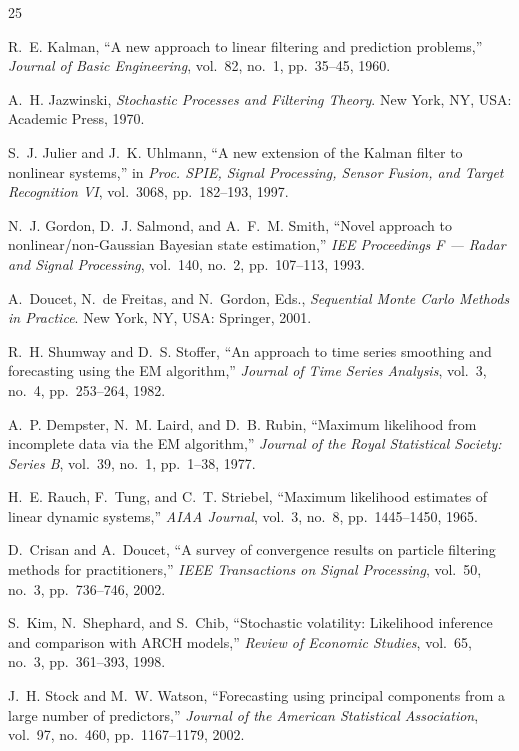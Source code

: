 \documentclass[conference]{IEEEtran}
\begin{document}

\begin{thebibliography}{25}

R.~E. Kalman, ``A new approach to linear filtering and prediction problems,''
\textit{Journal of Basic Engineering}, vol.~82, no.~1, pp.~35--45, 1960.

A.~H. Jazwinski, \textit{Stochastic Processes and Filtering Theory}.
New York, NY, USA: Academic Press, 1970.

S.~J. Julier and J.~K. Uhlmann, ``A new extension of the Kalman filter to nonlinear systems,'' in \textit{Proc. SPIE, Signal Processing, Sensor Fusion, and Target Recognition VI}, vol.~3068, pp.~182--193, 1997.

N.~J. Gordon, D.~J. Salmond, and A.~F.~M. Smith, ``Novel approach to nonlinear/non-Gaussian Bayesian state estimation,'' \textit{IEE Proceedings F --- Radar and Signal Processing}, vol.~140, no.~2, pp.~107--113, 1993.

A.~Doucet, N.~de Freitas, and N.~Gordon, Eds., \textit{Sequential Monte Carlo Methods in Practice}. New York, NY, USA: Springer, 2001.

R.~H. Shumway and D.~S. Stoffer, ``An approach to time series smoothing and forecasting using the EM algorithm,'' \textit{Journal of Time Series Analysis}, vol.~3, no.~4, pp.~253--264, 1982.

A.~P. Dempster, N.~M. Laird, and D.~B. Rubin, ``Maximum likelihood from incomplete data via the EM algorithm,'' \textit{Journal of the Royal Statistical Society: Series B}, vol.~39, no.~1, pp.~1--38, 1977.

H.~E. Rauch, F.~Tung, and C.~T. Striebel, ``Maximum likelihood estimates of linear dynamic systems,'' \textit{AIAA Journal}, vol.~3, no.~8, pp.~1445--1450, 1965.

D.~Crisan and A.~Doucet, ``A survey of convergence results on particle filtering methods for practitioners,'' \textit{IEEE Transactions on Signal Processing}, vol.~50, no.~3, pp.~736--746, 2002.

S.~Kim, N.~Shephard, and S.~Chib, ``Stochastic volatility: Likelihood inference and comparison with ARCH models,'' \textit{Review of Economic Studies}, vol.~65, no.~3, pp.~361--393, 1998.

J.~H. Stock and M.~W. Watson, ``Forecasting using principal components from a large number of predictors,'' \textit{Journal of the American Statistical Association}, vol.~97, no.~460, pp.~1167--1179, 2002.


\end{thebibliography}
\end{document}
